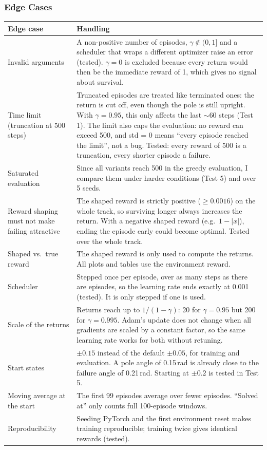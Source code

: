 \subsubsection{Edge Cases}

\begin{center}
\small
\begin{tabularx}{\textwidth}{@{}p{3.6cm}L@{}}
  \toprule
  \textbf{Edge case} & \textbf{Handling} \\
  \midrule
  Invalid arguments & A non-positive number of episodes, $\gamma \notin (0, 1]$ and a scheduler that wraps a different optimizer raise an error (tested). $\gamma = 0$ is excluded because every return would then be the immediate reward of 1, which gives no signal about survival. \\
  Time limit (truncation at 500 steps) & Truncated episodes are treated like terminated ones: the return is cut off, even though the pole is still upright. With $\gamma = 0.95$, this only affects the last $\sim$60 steps (Test 1). The limit also caps the evaluation: no reward can exceed 500, and std = 0 means ``every episode reached the limit'', not a bug. Tested: every reward of 500 is a truncation, every shorter episode a failure. \\
  Saturated evaluation & Since all variants reach 500 in the greedy evaluation, I compare them under harder conditions (Test 5) and over 5 seeds. \\
  Reward shaping must not make failing attractive & The shaped reward is strictly positive ($\geq 0.0016$) on the whole track, so surviving longer always increases the return. With a negative shaped reward (e.g.\ $1 - |x|$), ending the episode early could become optimal. Tested over the whole track. \\
  Shaped vs.\ true reward & The shaped reward is only used to compute the returns. All plots and tables use the environment reward. \\
  Scheduler & Stepped once per episode, over as many steps as there are episodes, so the learning rate ends exactly at 0.001 (tested). It is only stepped if one is used. \\
  Scale of the returns & Returns reach up to $1/(1-\gamma)$: 20 for $\gamma = 0.95$ but 200 for $\gamma = 0.995$. Adam's update does not change when all gradients are scaled by a constant factor, so the same learning rate works for both without retuning. \\
  Start states & $\pm 0.15$ instead of the default $\pm 0.05$, for training and evaluation. A pole angle of 0.15\,rad is already close to the failure angle of 0.21\,rad. Starting at $\pm 0.2$ is tested in Test 5. \\
  Moving average at the start & The first 99 episodes average over fewer episodes. ``Solved at'' only counts full 100-episode windows. \\
  Reproducibility & Seeding PyTorch and the first environment reset makes training reproducible; training twice gives identical rewards (tested). \\
  \bottomrule
\end{tabularx}
\end{center}


